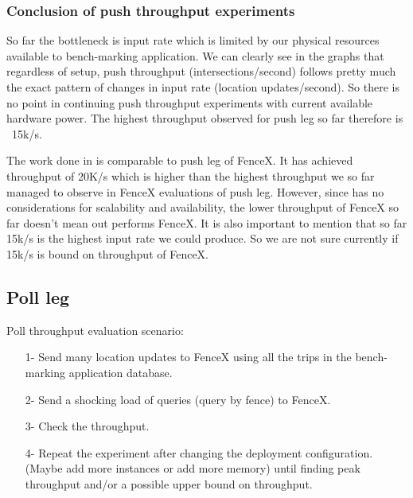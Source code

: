 \documentclass[a4]{report}
\begin{document}
    \subsubsection{Conclusion of push throughput experiments}
    So far the bottleneck is input rate which is limited by our physical resources available to bench-marking
    application.
    We can clearly see in the graphs that regardless of setup, push throughput (intersections/second) follows pretty
    much the exact pattern of changes in input rate (location updates/second).
    So there is no point in continuing push throughput experiments with current available hardware power.
    The highest throughput observed for push leg so far therefore is ~15k/s.

    The work done in \cite{Nechifor_Comnac_2013} is comparable to push leg of FenceX.
    It has achieved throughput of 20K/s which is higher than the highest throughput we so far managed to observe in
    FenceX evaluations of push leg.
    However, since \cite{Nechifor_Comnac_2013} has no considerations for scalability and availability, the lower
    throughput of FenceX so far doesn't mean \cite{Nechifor_Comnac_2013} out performs FenceX.
    It is also important to mention that so far 15k/s is the highest input rate we could produce.
    So we are not sure currently if 15k/s is bound on throughput of FenceX.

    \clearpage

    \subsection{Poll leg}
    Poll throughput evaluation scenario:
    \begin{itemize}
        \item[1-] Send many location updates to FenceX using all the trips in the bench-marking application database.
        \item[2-] Send a shocking load of queries (query by fence) to FenceX.
        \item[3-] Check the throughput.
        \item[4-] Repeat the experiment after changing the deployment configuration. (Maybe add more instances or add
        more memory) until finding peak throughput and/or a possible upper bound on throughput.
    \end{itemize}
\end{document}
